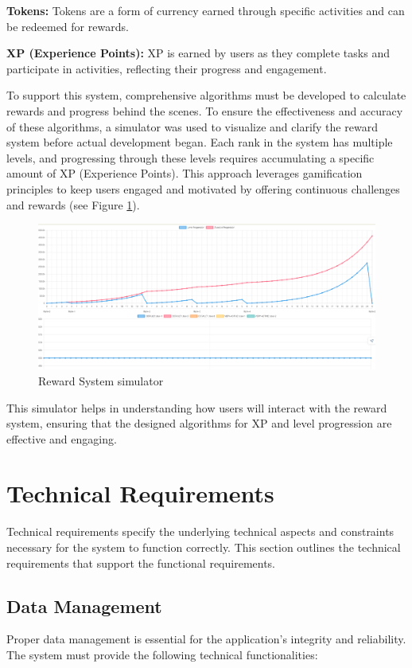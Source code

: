 \textbf{Tokens:} Tokens are a form of currency earned through specific activities and can be redeemed for rewards.

\textbf{XP (Experience Points):} XP is earned by users as they complete tasks and participate in activities, reflecting their progress and engagement.

To support this system, comprehensive algorithms must be developed to calculate rewards and progress behind the scenes. To ensure the effectiveness and accuracy of these algorithms, a simulator was used to visualize and clarify the reward system before actual development began. Each rank in the system has multiple levels, and progressing through these levels requires accumulating a specific amount of XP (Experience Points). This approach leverages gamification principles to keep users engaged and motivated by offering continuous challenges and rewards (see Figure \ref{fig:reward_system_simulator}).

\begin{figure}[H]
    \centering
    \includegraphics[width=1\textwidth]{src/assets/images/simulator.png}
    \caption{Reward System simulator}
    \label{fig:reward_system_simulator}
\end{figure}

This simulator helps in understanding how users will interact with the reward system, ensuring that the designed algorithms for XP and level progression are effective and engaging.
 

\section{Technical Requirements}
Technical requirements specify the underlying technical aspects and constraints necessary for the system to function correctly. This section outlines the technical requirements that support the functional requirements.

\subsection{Data Management}
Proper data management is essential for the application's integrity and reliability. The system must provide the following technical functionalities:

